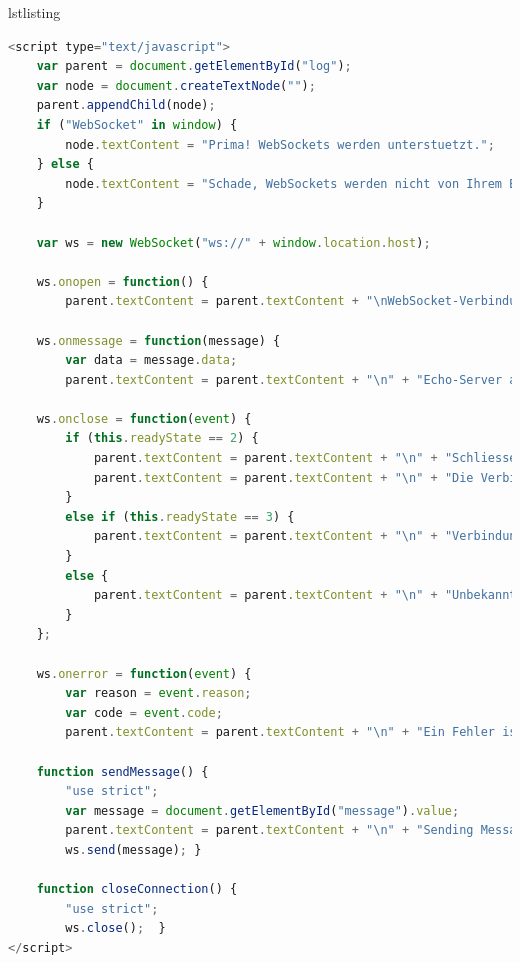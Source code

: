 \documentclass[a4paper, justified, notoc]{tufte-handout} %
\makeatletter
\newenvironment{listing}[1][htbp] %
  {\ifvmode\else\unskip\fi\begin{@tufte@float}[#1]{lstlisting}{}}
  {\end{@tufte@float} } %
\makeatother
\begin{document}
\begin{listing} %
\begin{lstlisting}[language=JavaScript]
<script type="text/javascript">
    var parent = document.getElementById("log");
    var node = document.createTextNode("");
    parent.appendChild(node);
    if ("WebSocket" in window) {
        node.textContent = "Prima! WebSockets werden unterstuetzt.";
    } else {
        node.textContent = "Schade, WebSockets werden nicht von Ihrem Browser unterstuetzt";
    }
    
    var ws = new WebSocket("ws://" + window.location.host);
    
    ws.onopen = function() {
        parent.textContent = parent.textContent + "\nWebSocket-Verbindung aufgebaut mit " + ws.url; };
    
    ws.onmessage = function(message) {
        var data = message.data;
        parent.textContent = parent.textContent + "\n" + "Echo-Server antwortet: " + data.toString(); };
    
    ws.onclose = function(event) {
        if (this.readyState == 2) {
            parent.textContent = parent.textContent + "\n" + "Schliesse Verbindung zum Server...";
            parent.textContent = parent.textContent + "\n" + "Die Verbindung durchlaeuft den Closing Handshake...";
        }
        else if (this.readyState == 3) {
            parent.textContent = parent.textContent + "\n" + "Verbindung geschlossen!";
        }
        else {
            parent.textContent = parent.textContent + "\n" + "Unbekannter ReadyState: " + this.readyState;
        }
    };
    
    ws.onerror = function(event) {
        var reason = event.reason;
        var code = event.code;
        parent.textContent = parent.textContent + "\n" + "Ein Fehler ist aufgetreten: " + reason + " - " + code; }
    
    function sendMessage() {
        "use strict";
        var message = document.getElementById("message").value;
        parent.textContent = parent.textContent + "\n" + "Sending Message to Echo-Server: " + message;
        ws.send(message); }
    
    function closeConnection() {
        "use strict";
        ws.close();  }
</script>
\end{lstlisting}
	\caption{JavaScript part of the WebSocket echo client}
	\label{echo_client_2}
\end{listing}
\end{document}
